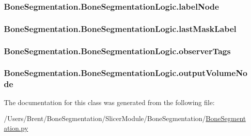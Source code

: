 \subsubsection[{label\+Node}]{\setlength{\rightskip}{0pt plus 5cm}Bone\+Segmentation.\+Bone\+Segmentation\+Logic.\+label\+Node}\label{class_bone_segmentation_1_1_bone_segmentation_logic_aa5507f8f268b711b186df8c74a4b9583}
\hypertarget{class_bone_segmentation_1_1_bone_segmentation_logic_ae4725ea90e295cc00dab5cab11a0a646}{}
\subsubsection[{last\+Mask\+Label}]{\setlength{\rightskip}{0pt plus 5cm}Bone\+Segmentation.\+Bone\+Segmentation\+Logic.\+last\+Mask\+Label}\label{class_bone_segmentation_1_1_bone_segmentation_logic_ae4725ea90e295cc00dab5cab11a0a646}
\hypertarget{class_bone_segmentation_1_1_bone_segmentation_logic_a33fd5044dde775bd35d754df789123f1}{}
\subsubsection[{observer\+Tags}]{\setlength{\rightskip}{0pt plus 5cm}Bone\+Segmentation.\+Bone\+Segmentation\+Logic.\+observer\+Tags}\label{class_bone_segmentation_1_1_bone_segmentation_logic_a33fd5044dde775bd35d754df789123f1}
\hypertarget{class_bone_segmentation_1_1_bone_segmentation_logic_a2d6bb5dea3368d499007ccfbcc4c1ecc}{}
\subsubsection[{output\+Volume\+Node}]{\setlength{\rightskip}{0pt plus 5cm}Bone\+Segmentation.\+Bone\+Segmentation\+Logic.\+output\+Volume\+Node}\label{class_bone_segmentation_1_1_bone_segmentation_logic_a2d6bb5dea3368d499007ccfbcc4c1ecc}


The documentation for this class was generated from the following file\+:\begin{DoxyCompactItemize}
\item 
/\+Users/\+Brent/\+Bone\+Segmentation/\+Slicer\+Module/\+Bone\+Segmentation/\hyperlink{_bone_segmentation_8py}{Bone\+Segmentation.\+py}\end{DoxyCompactItemize}
